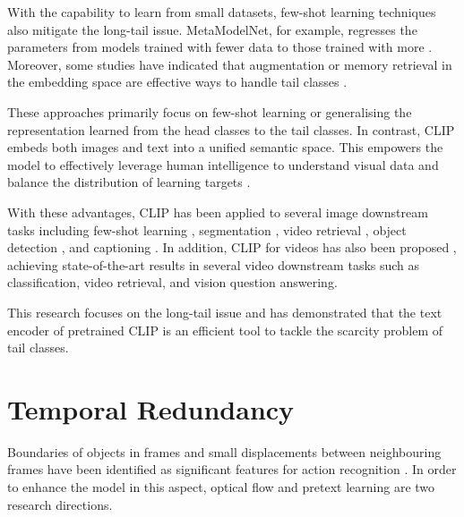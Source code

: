With the capability to learn from small datasets, few-shot learning techniques also mitigate the long-tail issue. MetaModelNet, for example, regresses the parameters from models trained with fewer data to those trained with more \parencite{NIPS2017_147ebe63}. Moreover, some studies have indicated that augmentation or memory retrieval in the embedding space are effective ways to handle tail classes \parencite{liu2019large, Zhu_2020_CVPR, li2021metasaug, Fu_2022_ACCV}.

These approaches primarily focus on few-shot learning or generalising the representation learned from the head classes to the tail classes. In contrast,  CLIP \parencite{radford2021learning} embeds both images and text into a unified semantic space. This empowers the model to effectively leverage human intelligence to understand visual data and balance the distribution of learning targets \parencite{ma2022x}. 


With these advantages, CLIP has been applied to several image downstream tasks including few-shot learning \parencite{zhang2022tip}, segmentation \parencite{wang2022cris}, video retrieval \parencite{ma2022x}, object detection \parencite{lin2023gridclip}, and captioning \parencite{mokady2021clipcap}. In addition, CLIP for videos has also been proposed \parencite{xu-etal-2021-videoclip, wang2022internvideo}, achieving state-of-the-art results in several video downstream tasks such as classification, video retrieval, and vision question answering.

This research focuses on the long-tail issue and has demonstrated that the text encoder of pretrained CLIP is an efficient tool to tackle the scarcity problem of tail classes.

\section{Temporal Redundancy}
Boundaries of objects in frames and small displacements between neighbouring frames have been identified as significant features for action recognition \parencite{10.1007/978-3-030-12939-2_20}. In order to enhance the model in this aspect, optical flow and pretext learning are two research directions. 

